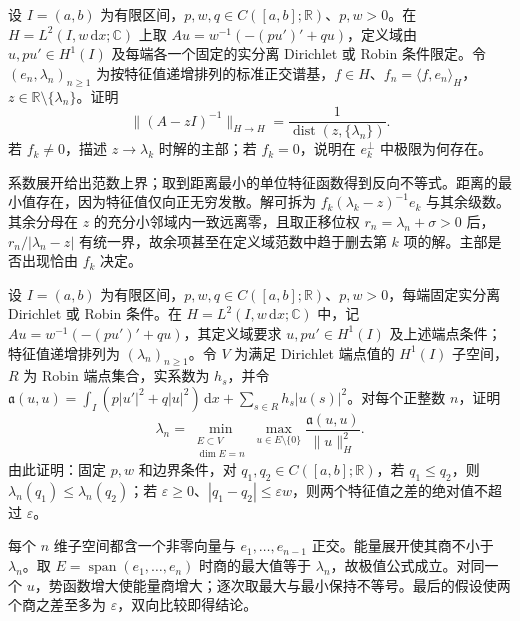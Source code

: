 \begin{exercise}\label{b2:ex:10-resonance-norm}
设 \(I=(a,b)\) 为有限区间，\(p,w,q\in C([a,b];\mathbb R)\)、\(p,w>0\)。在 \(H=L^2(I,w\,\mathrm dx;\mathbb C)\) 上取 \(Au=w^{-1}(-(pu')'+qu)\)，定义域由 \(u,pu'\in H^1(I)\) 及每端各一个固定的实分离 Dirichlet 或 Robin 条件限定。令 \((e_n,\lambda_n)_{n\geq1}\) 为按特征值递增排列的标准正交谱基，\(f\in H\)、\(f_n=\langle f,e_n\rangle_H\)，\(z\in\mathbb R\setminus\{\lambda_n\}\)。证明
\[
 \|(A-zI)^{-1}\|_{H\to H}
 =\dfrac1{\operatorname{dist}(z,\{\lambda_n\})}.
\]
若 \(f_k\ne0\)，描述 \(z\to\lambda_k\) 时解的主部；若 \(f_k=0\)，说明在 \(e_k^\perp\) 中极限为何存在。
\end{exercise}
\begin{solution}
系数展开给出范数上界；取到距离最小的单位特征函数得到反向不等式。距离的最小值存在，因为特征值仅向正无穷发散。解可拆为 \(f_k(\lambda_k-z)^{-1}e_k\) 与其余级数。其余分母在 \(z\) 的充分小邻域内一致远离零，且取正移位权 \(r_n=\lambda_n+\sigma>0\) 后，\(r_n/|\lambda_n-z|\) 有统一界，故余项甚至在定义域范数中趋于删去第 \(k\) 项的解。主部是否出现恰由 \(f_k\) 决定。
\end{solution}

\begin{exercise}\label{b2:ex:10-potential-comparison}
设 \(I=(a,b)\) 为有限区间，\(p,w,q\in C([a,b];\mathbb R)\)、\(p,w>0\)，每端固定实分离 Dirichlet 或 Robin 条件。在 \(H=L^2(I,w\,\mathrm dx;\mathbb C)\) 中，记 \(Au=w^{-1}(-(pu')'+qu)\)，其定义域要求 \(u,pu'\in H^1(I)\) 及上述端点条件；特征值递增排列为 \((\lambda_n)_{n\geq1}\)。令 \(V\) 为满足 Dirichlet 端点值的 \(H^1(I)\) 子空间，\(R\) 为 Robin 端点集合，实系数为 \(h_s\)，并令 \(\mathfrak a(u,u)=\int_I(p|u'|^2+q|u|^2)\,\mathrm dx+\sum_{s\in R}h_s|u(s)|^2\)。对每个正整数 \(n\)，证明
\[
 \lambda_n=\min_{\substack{E\subset V\\\dim E=n}}
 \max_{u\in E\setminus\{0\}}\dfrac{\mathfrak a(u,u)}{\|u\|_H^2}.
\]
由此证明：固定 \(p,w\) 和边界条件，对 \(q_1,q_2\in C([a,b];\mathbb R)\)，若 \(q_1\leq q_2\)，则 \(\lambda_n(q_1)\leq\lambda_n(q_2)\)；若 \(\varepsilon\geq0\)、\(|q_1-q_2|\leq\varepsilon w\)，则两个特征值之差的绝对值不超过 \(\varepsilon\)。
\end{exercise}
\begin{solution}
每个 \(n\) 维子空间都含一个非零向量与 \(e_1,\ldots,e_{n-1}\) 正交。能量展开使其商不小于 \(\lambda_n\)。取 \(E=\operatorname{span}(e_1,\ldots,e_n)\) 时商的最大值等于 \(\lambda_n\)，故极值公式成立。对同一个 \(u\)，势函数增大使能量商增大；逐次取最大与最小保持不等号。最后的假设使两个商之差至多为 \(\varepsilon\)，双向比较即得结论。
\end{solution}

